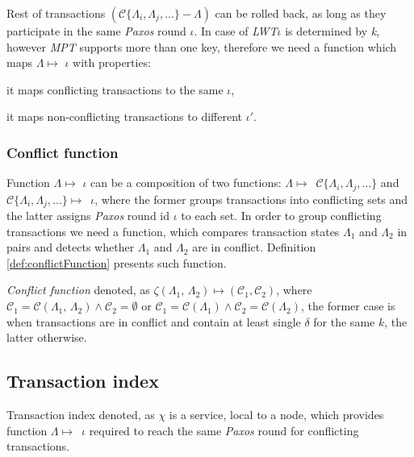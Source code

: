 \documentclass[runningheads,a4paper]{llncs}
\newcommand{\txStates}{$\{\Lambda_{i}, \Lambda_{j}, ...\}$\xspace}
\newcommand{\conflictingTxSet}{$\mathcal{C}\text{\txStates}$\xspace}
\newcommand{\paxosRoundId}{$\iota$\xspace}
\newcommand{\txState}{$\Lambda$\xspace}
\newcommand{\txStateOne}{$\Lambda_1$\xspace}
\newcommand{\txStateTwo}{$\Lambda_2$\xspace}
\newcommand{\txIndex}{$\chi$\xspace}
\newcommand{\paxos}{\emph{Paxos}\xspace}
\newcommand{\mpt}{\emph{MPT}\xspace}
\newcommand{\lwt}{\emph{LWT}\xspace}
\begin{document}
Rest of transactions $(\mathcal{C}\text{\txStates} - \text{\txState})$ can be rolled back, as long as they participate in the same \paxos round \paxosRoundId. In case of \lwt \paxosRoundId is determined by \emph{k}, however \mpt supports more than one key, therefore we need a function which maps \txState $\mapsto $ \paxosRoundId with properties: 
\begin{enumerate*}[label=\alph*)]
\item it maps conflicting transactions to the same \paxosRoundId,
\item it maps non-conflicting transactions to different $\iota'$.
\end{enumerate*}

\subsubsection{Conflict function}
Function \txState $\mapsto $ \paxosRoundId can be a composition of two functions: \mbox{\txState $\mapsto $ \conflictingTxSet} and \mbox{\conflictingTxSet $\mapsto$ \paxosRoundId}, where the former groups transactions into conflicting sets and the latter assigns \paxos round id \paxosRoundId to each set.
In order to group conflicting transactions we need a function, which compares transaction states \txStateOne and \txStateTwo in pairs and detects whether
\txStateOne and \txStateTwo are in conflict. Definition \ref{def:conflictFunction} presents such function.

\begin{definition}
\label{def:conflictFunction}
\emph{Conflict function} denoted, as $\zeta (\text{\txStateOne, \txStateTwo}) \mapsto ( \mathcal{C}_1, \mathcal{C}_2)$, where $\mathcal{C}_1 = \mathcal{C}(\text{\txStateOne, \txStateTwo}) \wedge \mathcal{C}_2 = \emptyset $ or $\mathcal{C}_1 = \mathcal{C}(\text{\txStateOne}) \wedge \mathcal{C}_2=\mathcal{C}(\text{\txStateTwo})$, the former case is when transactions are in conflict and contain at least single $\delta$ for the same $k$, the latter otherwise.
\end{definition}
 
\subsection{Transaction index}
Transaction index denoted, as \txIndex is a service, local to a node, which provides function \mbox{\txState $\mapsto $ \paxosRoundId} required to reach the same \paxos round for conflicting transactions.
\end{document}
